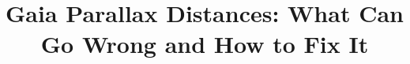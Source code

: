 \documentclass[twocolumn]{aastex631}
\begin{document}
\title{Gaia Parallax Distances: What Can Go Wrong and How to Fix It}



\end{document}
